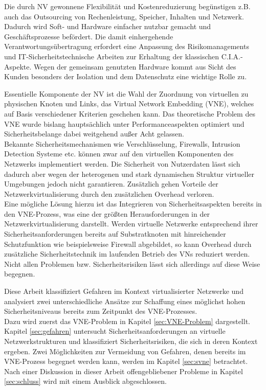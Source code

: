 Die durch NV gewonnene Flexibilität und Kostenreduzierung begünstigen z.B. auch das Outsourcing von Rechenleistung, Speicher, Inhalten und Netzwerk. Dadurch wird Soft- und Hardware einfacher nutzbar gemacht und Geschäftsprozesse befördert. 
Die damit einhergehende Verantwortungsübertragung erfordert eine Anpassung des Risikomanagements und IT-Sicherheitstechnische Arbeiten zur Erhaltung der klassischen C.I.A.-Aspekte. Wegen der gemeinsam genutzten Hardware kommt aus Sicht des Kunden besonders der Isolation und dem Datenschutz eine wichtige Rolle zu.

Essentielle Komponente der NV ist die Wahl der Zuordnung von virtuellen zu physischen Knoten und Links, das Virtual Network Embedding (VNE), welches auf Basis verschiedener Kriterien geschehen kann. Das theoretische Problem des VNE wurde bislang hauptsächlich unter Performanceaspekten optimiert und Sicherheitsbelange dabei weitgehend außer Acht gelassen.\\
Bekannte Sicherheitsmechanismen wie Verschlüsselung, Firewalls, Intrusion Detection Systeme etc. können zwar auf den virtuellen Komponenten des Netzwerks implementiert werden. Die Sicherheit von Nutzerdaten lässt sich dadurch aber wegen der heterogenen und stark dynamischen Struktur virtueller Umgebungen jedoch nicht garantieren. Zusätzlich gehen Vorteile der Netzwerkvirtualisierung durch den zusätzlichen Overhead verloren. \cite{gong2016virtual}\\
Eine mögliche Lösung hierzu ist das Integrieren von Sicherheitsaspekten bereits in den VNE-Prozess, was eine der größten Herausforderungen in der Netzwerkvirtualisierung darstellt. \cite{fischer2013virtual}
Werden virtuelle Netzwerke entsprechend ihrer Sicherheitsanforderungen bereits auf Substratknoten mit hinreichender Schutzfunktion wie beispielsweise Firewall abgebildet, so kann Overhead durch zusätzliche Sicherheitstechnik im laufenden Betrieb des VNs reduziert werden. Nicht allen Problemen bzw. Sicherheitsrisiken lässt sich allerdings auf diese Weise begegnen. \cite{bays2012security, gong2016virtual, wang2016towards} 


Diese Arbeit klassifiziert Gefahren im Kontext virtualisierter Netzwerke und analysiert zwei unterschiedliche Ansätze zur Schaffung eines möglichst hohen Sicherheitsniveaus bereits zum Zeitpunkt des VNE-Prozesses.\\
Dazu wird zuerst das VNE-Problem in Kapitel \ref{sec:VNE-Problem} dargestellt. Kapitel \ref{sec:gefahren} untersucht Sicherheitsanforderungen an virtuelle Netzwerkstrukturen und klassifiziert Sicherheitsrisiken, die sich in deren Kontext ergeben. Zwei Möglichkeiten zur Vermeidung von Gefahren, denen bereits im VNE-Prozess begegnet werden kann, werden im Kapitel \ref{sec:svne} betrachtet. Nach einer Diskussion in dieser Arbeit offengebliebener Probleme in Kapitel \ref{sec:schluss} wird mit einem Ausblick abgeschlossen.